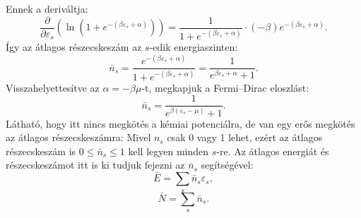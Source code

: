 \documentclass[../main.tex]{subfiles}
\begin{document}
Ennek a deriváltja:
\begin{equation}
    \frac{\partial}{\partial \varepsilon_s} \left( \ln (1 + e^{-(\beta \varepsilon_s + \alpha)}) \right) = \frac{1}{1 + e^{-(\beta \varepsilon_s + \alpha)}} \cdot (-\beta) e^{-(\beta \varepsilon_s + \alpha)}.
\end{equation}
Így az átlagos részecskeszám az $s$-edik energiaszinten:
\begin{equation}
    \bar{n}_s = \frac{e^{-(\beta \varepsilon_s + \alpha)}}{1 + e^{-(\beta \varepsilon_s + \alpha)}} = \frac{1}{e^{\beta \varepsilon_s + \alpha} + 1}.
\end{equation}
Visszahelyettesítve az $\alpha = - \beta \mu$-t, megkapjuk a Fermi–Dirac eloszlást:
\begin{equation}
    \boxed{
    \bar{n}_s = \frac{1}{e^{\beta (\varepsilon_s - \mu)} + 1}.
    }
\end{equation}
Látható, hogy itt nincs megkötés a kémiai potenciálra, de van egy erős megkötés az átlagos részecskeszámra: Mivel $n_s$ csak 0 vagy 1 lehet, ezért az átlagos részecskeszám is $0 \leq \bar{n}_s \leq 1$ kell legyen minden $s$-re.
Az átlagos energiát és részecskeszámot itt is ki tudjuk fejezni az $\bar{n}_s$ segítségével:
\begin{equation}
    \bar{E} = \sum_s \bar{n}_s \varepsilon_s,
\end{equation}
\begin{equation}
    \bar{N} = \sum_s \bar{n}_s.
\end{equation}
\end{document}
